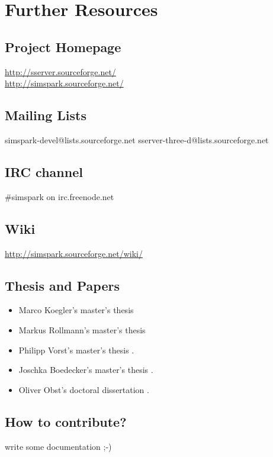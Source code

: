 \chapter{Further Resources}
\label{cha:resources}


\section{Project Homepage}

\url{http://sserver.sourceforge.net/}\\
\url{http://simspark.sourceforge.net/}

\section{Mailing Lists}

simspark-devel@lists.sourceforge.net
sserver-three-d@lists.sourceforge.net

\section{IRC channel}

\#simspark on irc.freenode.net

\section{Wiki}

\url{http://simspark.sourceforge.net/wiki/}

\section{Thesis and Papers}

\begin{itemize}
\item Marco Koegler's master's thesis \cite{Koegler03}
\item Markus Rollmann's master's thesis \cite{Rollmann04}
\item Philipp Vorst's master's thesis \cite{Vorst06}.
\item Joschka Boedecker's master's thesis \cite{Boedecker06}.
\item Oliver Obst's doctoral dissertation \cite{Obst07}.
\end{itemize}

\section{How to contribute?}

write some documentation ;-)

